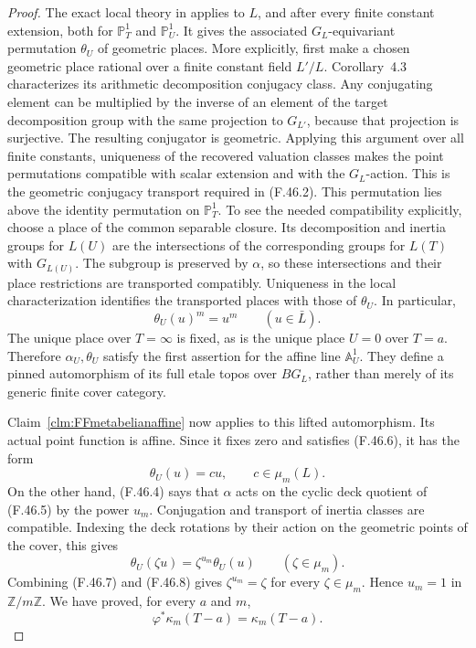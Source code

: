 \documentclass[11pt]{article}
\begin{document}
\begin{proof}
The exact local theory in
\citet[Theorem~4.1 and Corollaries~4.3--4.5]
{FF_Koenigsmann2003} applies to \(L\), and after every
finite constant extension, both for \(\mathbb P^1_T\)
and \(\mathbb P^1_U\). It gives the associated
\(G_L\)-equivariant permutation \(\theta_U\) of
geometric places. More explicitly, first make a chosen
geometric place rational over a finite constant field
\(L'/L\). Corollary~4.3 characterizes its arithmetic
decomposition conjugacy class. Any conjugating element
can be multiplied by the inverse of an element of the
target decomposition group with the same projection to
\(G_{L'}\), because that projection is surjective.
The resulting conjugator is geometric. Applying this
argument over all finite constants, uniqueness of the
recovered valuation classes makes the point permutations
compatible with scalar extension and with the
\(G_L\)-action. This is the geometric conjugacy
transport required in (F.46.2).
This permutation lies above the
identity permutation on \(\mathbb P^1_T\). To see
the needed compatibility explicitly, choose a place of
the common separable closure. Its decomposition and
inertia groups for \(L(U)\) are the intersections of
the corresponding groups for \(L(T)\) with
\(G_{L(U)}\). The subgroup is preserved by
\(\alpha\), so these intersections and their place
restrictions are transported compatibly. Uniqueness in
the local characterization identifies the transported
places with those of \(\theta_U\). In particular,
\[
                           \theta_U(u)^m=u^m
                  \qquad(u\in\bar L).
                                                        \tag{F.46.6}
\]
The unique place over \(T=\infty\) is fixed, as is
the unique place \(U=0\) over \(T=a\). Therefore
\(\alpha_U,\theta_U\) satisfy the first assertion
for the affine line \(\mathbb A^1_U\). They define
a pinned automorphism of its full etale topos over
\(BG_L\), rather than merely of its generic finite
cover category.

Claim~\ref{clm:FFmetabelianaffine} now applies to this
lifted automorphism. Its actual point function is affine.
Since it fixes zero and satisfies (F.46.6), it has the
form
\[
                       \theta_U(u)=c u,
                       \qquad c\in\mu_m(L).
                                                        \tag{F.46.7}
\]
On the other hand, (F.46.4) says that \(\alpha\)
acts on the cyclic deck quotient of (F.46.5) by the
power \(u_m\). Conjugation and transport of inertia
classes are compatible. Indexing the deck rotations by
their action on the geometric points of the cover,
this gives
\[
                    \theta_U(\zeta u)
                          =\zeta^{u_m}\theta_U(u)
                    \qquad(\zeta\in\mu_m).
                                                        \tag{F.46.8}
\]
Combining
(F.46.7) and (F.46.8) gives
\(\zeta^{u_m}=\zeta\) for every \(\zeta\in\mu_m\).
Hence \(u_m=1\) in \(\mathbb Z/m\mathbb Z\).
We have proved, for every \(a\) and \(m\),
\[
                  \varphi^*\kappa_m(T-a)=\kappa_m(T-a).
                                                        \tag{F.46.9}
\]


\end{proof}
\end{document}
